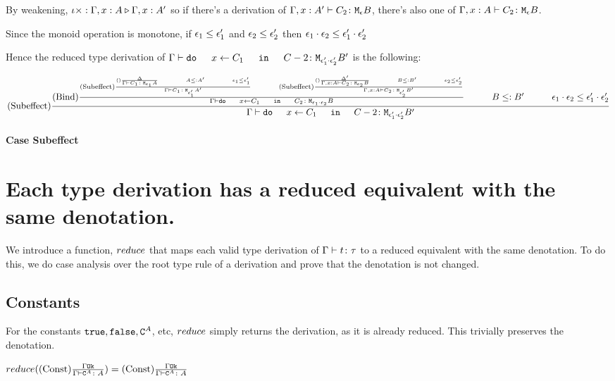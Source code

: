 {    By weakening, $\iota\times : \Gamma, x:A \triangleright \Gamma, x: A'$ so if there's a derivation of $\Gamma, x:A' \vdash C_2 \colon \texttt{M}_{\epsilon}{B}$, there's also one of   $\Gamma, x: A \vdash C_2 \colon \texttt{M}_{\epsilon}{B}$.

    Since the monoid operation is monotone, if $\epsilon_1\leq\epsilon_1'$ and $\epsilon_2\leq\epsilon_2'$ then $\epsilon_1\cdot\epsilon_2 \leq \epsilon_1'\cdot\epsilon_2'$

    Hence the reduced type derivation of $\gtyperelation{\doin{x}{C_1}{C-2}}{\M{\e_1'\dot\e_2'}{B'}}$ is the following:

    \begin{equation}
        \treerule{Subeffect} {
            \treerule{Bind}{
                \deltacrule{\G}{C_1}{\e_1}{A}{\e_1'}{A'}
                \s\s
                \deltacruleprime{\G, x:A}{C_2}{\e_2}{B}{\e_2'}{B'}
            } {
                \gtyperelation{\doin{x}{C_1}{C_2}}{\M{\e_1\dot\e_2}{B}}
            }
            \s\s
            B\subtype B'
            \s\s
            \e_1\dot\e_2\subeffect\e_1'\dot\e_2'
        } {
            \gtyperelation{\doin{x}{C_1}{C-2}}{\M{\e_1'\dot\e_2'}{B'}}
        }
    \end{equation}

    \paragraph{Case Subeffect}

    \section{Each type derivation has a reduced equivalent with the same denotation.}
    We introduce a function, $reduce$ that maps each valid type derivation of $\Gamma \vdash t \colon \tau$ to a reduced equivalent with the same denotation. To do this, we do case analysis over the root type rule of a derivation and prove that the denotation is not changed. 

        \subsection{Constants}
            For the constants $\texttt{true}, \texttt{false}, \texttt{C}^{A}$, etc, $reduce$ simply returns the derivation, as it is already reduced. This trivially preserves the denotation.

            $reduce((\text{Const}) \frac{\Gamma \texttt{Ok}}{\Gamma \vdash \texttt{C}^{A} \colon A}) = (\text{Const}) \frac{\Gamma \texttt{Ok}}{\Gamma \vdash \texttt{C}^{A} \colon A}$

}
